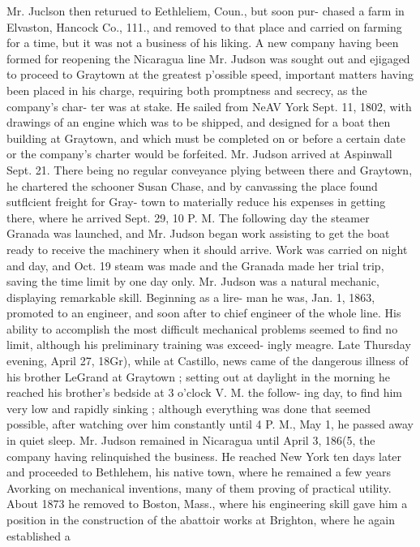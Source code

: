 Mr. Juclson then returued to Eethleliem, Coun., but soon pur- 
chased a farm in Elvaston, Hancock Co., 111., and removed to 
that place and carried on farming for a time, but it was not a 
business of his liking. A new company having been formed 
for reopening the Nicaragua line Mr. Judson was sought out 
and ejigaged to proceed to Graytown at the greatest p'ossible 
speed, important matters having been placed in his charge, 
requiring both promptness and secrecy, as the company's char- 
ter was at stake. He sailed from NeAV York Sept. 11, 1802, 
with drawings of an engine which was to be shipped, and 
designed for a boat then building at Graytown, and which must 
be completed on or before a certain date or the company's 
charter would be forfeited. Mr. Judson arrived at Aspinwall 
Sept. 21. There being no regular conveyance plying between 
there and Graytown, he chartered the schooner Susan Chase, 
and by canvassing the place found sutflcient freight for Gray- 
town to materially reduce his expenses in getting there, where 
he arrived Sept. 29, 10 P. M. The following day the steamer 
Granada was launched, and Mr. Judson began work assisting 
to get the boat ready to receive the machinery when it should 
arrive. Work was carried on night and day, and Oct. 19 
steam was made and the Granada made her trial trip, saving 
the time limit by one day only. Mr. Judson was a natural 
mechanic, displaying remarkable skill. Beginning as a lire- 
man he was, Jan. 1, 1863, promoted to an engineer, and soon 
after to chief engineer of the whole line. His ability to 
accomplish the most difficult mechanical problems seemed to 
find no limit, although his preliminary training was exceed- 
ingly meagre. Late Thursday evening, April 27, 18Gr), while 
at Castillo, news came of the dangerous illness of his brother 
LeGrand at Graytown ; setting out at daylight in the morning 
he reached his brother's bedside at 3 o'clock V. M. the follow- 
ing day, to find him very low and rapidly sinking ; although 
everything was done that seemed possible, after watching over 
him constantly until 4 P. M., May 1, he passed away in quiet 
sleep. Mr. Judson remained in Nicaragua until April 3, 186(5, 
the company having relinquished the business. He reached 
New York ten days later and proceeded to Bethlehem, his 
native town, where he remained a few years Avorking on 
mechanical inventions, many of them proving of practical 
utility. About 1873 he removed to Boston, Mass., where his 
engineering skill gave him a position in the construction of 
the abattoir works at Brighton, where he again established a 
